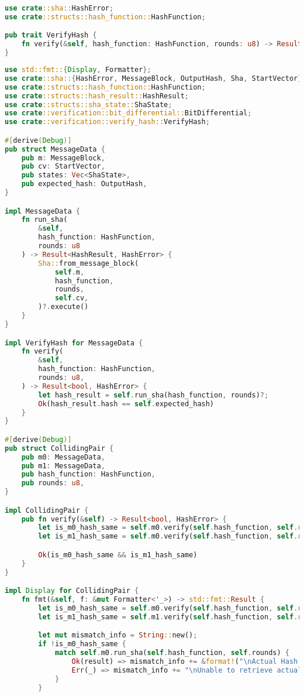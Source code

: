 \begin{lstlisting}[language=rust, caption={verification/verify\_hash.rs}]
use crate::sha::HashError;
use crate::structs::hash_function::HashFunction;

pub trait VerifyHash {
	fn verify(&self, hash_function: HashFunction, rounds: u8) -> Result<bool, HashError>;
}
\end{lstlisting}

\begin{lstlisting}[language=rust, caption={verification/colliding\_pair.rs}]
use std::fmt::{Display, Formatter};
use crate::sha::{HashError, MessageBlock, OutputHash, Sha, StartVector};
use crate::structs::hash_function::HashFunction;
use crate::structs::hash_result::HashResult;
use crate::structs::sha_state::ShaState;
use crate::verification::bit_differential::BitDifferential;
use crate::verification::verify_hash::VerifyHash;

#[derive(Debug)]
pub struct MessageData {
	pub m: MessageBlock,
	pub cv: StartVector,
	pub states: Vec<ShaState>,
	pub expected_hash: OutputHash,
}

impl MessageData {
	fn run_sha(
		&self,
		hash_function: HashFunction,
		rounds: u8
	) -> Result<HashResult, HashError> {
		Sha::from_message_block(
			self.m,
			hash_function,
			rounds,
			self.cv,
		)?.execute()
	}
}

impl VerifyHash for MessageData {
	fn verify(
		&self,
		hash_function: HashFunction,
		rounds: u8,
	) -> Result<bool, HashError> {
		let hash_result = self.run_sha(hash_function, rounds)?;
		Ok(hash_result.hash == self.expected_hash)
	}
}

#[derive(Debug)]
pub struct CollidingPair {
	pub m0: MessageData,
	pub m1: MessageData,
	pub hash_function: HashFunction,
	pub rounds: u8,
}

impl CollidingPair {
	pub fn verify(&self) -> Result<bool, HashError> {
		let is_m0_hash_same = self.m0.verify(self.hash_function, self.rounds)?;
		let is_m1_hash_same = self.m0.verify(self.hash_function, self.rounds)?;

		Ok(is_m0_hash_same && is_m1_hash_same)
	}
}

impl Display for CollidingPair {
	fn fmt(&self, f: &mut Formatter<'_>) -> std::fmt::Result {
		let is_m0_hash_same = self.m0.verify(self.hash_function, self.rounds).unwrap_or(false);
		let is_m1_hash_same = self.m1.verify(self.hash_function, self.rounds).unwrap_or(false);

		let mut mismatch_info = String::new();
		if !is_m0_hash_same {
			match self.m0.run_sha(self.hash_function, self.rounds) {
				Ok(result) => mismatch_info += &format!("\nActual Hash: {}", result.hash),
				Err(_) => mismatch_info += "\nUnable to retrieve actual hash for M!",
			}
		}


\end{lstlisting}
